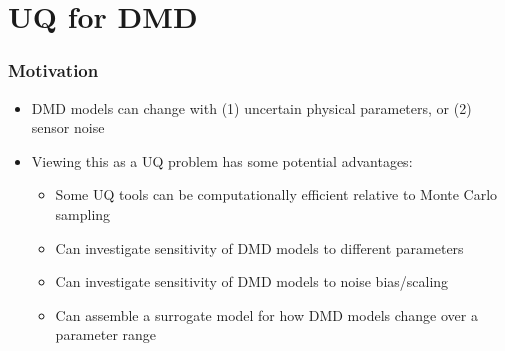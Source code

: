 \documentclass[9pt]{beamer}
\begin{document}
\section{UQ for DMD}
\label{sec-3}
\begin{frame}
\frametitle{Motivation}
\label{sec-3-1}

\begin{itemize}
\item DMD models can change with (1) uncertain physical parameters, or (2) sensor noise
\item Viewing this as a UQ problem has some potential advantages:
\begin{itemize}
\item Some UQ tools can be computationally efficient relative to Monte Carlo sampling
\item Can investigate sensitivity of DMD models to different parameters
\item Can investigate sensitivity of DMD models to noise bias/scaling
\item Can assemble a surrogate model for how DMD models change over a parameter range
\end{itemize}
\end{itemize}
\end{frame}
\end{document}
